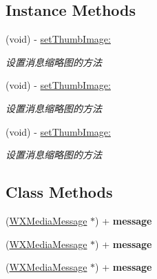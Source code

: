 \subsection*{Instance Methods}
\begin{DoxyCompactItemize}
\item 
(void) -\/ \mbox{\hyperlink{interface_w_x_media_message_ac3dbcbb2f989c4775df5747f9ce18bdf}{set\+Thumb\+Image\+:}}
\begin{DoxyCompactList}\small\item\em 设置消息缩略图的方法 \end{DoxyCompactList}\item 
(void) -\/ \mbox{\hyperlink{interface_w_x_media_message_ac3dbcbb2f989c4775df5747f9ce18bdf}{set\+Thumb\+Image\+:}}
\begin{DoxyCompactList}\small\item\em 设置消息缩略图的方法 \end{DoxyCompactList}\item 
(void) -\/ \mbox{\hyperlink{interface_w_x_media_message_ac3dbcbb2f989c4775df5747f9ce18bdf}{set\+Thumb\+Image\+:}}
\begin{DoxyCompactList}\small\item\em 设置消息缩略图的方法 \end{DoxyCompactList}\end{DoxyCompactItemize}
\subsection*{Class Methods}
\begin{DoxyCompactItemize}
\item 
\mbox{\label{interface_w_x_media_message_a28644b7b2ee0e75341f524fa57a68145}} 
(\mbox{\hyperlink{interface_w_x_media_message}{W\+X\+Media\+Message}} $\ast$) + {\bfseries message}
\item 
\mbox{\label{interface_w_x_media_message_a28644b7b2ee0e75341f524fa57a68145}} 
(\mbox{\hyperlink{interface_w_x_media_message}{W\+X\+Media\+Message}} $\ast$) + {\bfseries message}
\item 
\mbox{\label{interface_w_x_media_message_a28644b7b2ee0e75341f524fa57a68145}} 
(\mbox{\hyperlink{interface_w_x_media_message}{W\+X\+Media\+Message}} $\ast$) + {\bfseries message}
\end{DoxyCompactItemize}
